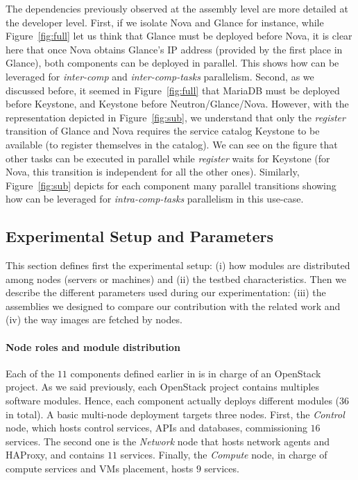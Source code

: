The dependencies previously observed at the assembly level are more
detailed at the developer level. First, if we isolate Nova and Glance
for instance, while Figure~\ref{fig:full} let us think that Glance
must be deployed before Nova, it is clear here that once Nova obtains
Glance's IP address (provided by the first place in Glance), both
components can be deployed in parallel. This shows how \mad can be
leveraged for \emph{inter-comp} and \emph{inter-comp-tasks}
parallelism.  Second, as we discussed before, it seemed in
Figure~\ref{fig:full} that MariaDB must be deployed before Keystone,
and Keystone before Neutron/Glance/Nova. However, with the \mad
representation depicted in Figure~\ref{fig:sub}, we understand that
only the \emph{register} transition of Glance and Nova requires the
service catalog Keystone to be available (\ie to register themselves
in the catalog). We can see on the figure that other tasks can be
executed in parallel while \emph{register} waits for Keystone (\eg for
Nova, this transition is independent for all the other
ones). Similarly, Figure~\ref{fig:sub} depicts for each component many
parallel transitions showing how \mad can be leveraged for
\emph{intra-comp-tasks} parallelism in this use-case.

\subsection{Experimental Setup and Parameters}

This section defines first the experimental setup: (i) how modules are
distributed among nodes (\ie servers or machines) and (ii) the testbed
characteristics. Then we describe the different parameters used during
our experimentation: (iii) the assemblies we designed to compare our
contribution with the related work and (iv) the way \docker images are
fetched by nodes.

\paragraph{Node roles and module distribution}
Each of the $11$ components defined earlier in \kolla is in charge of
an OpenStack project. As we said previously, each OpenStack project
contains multiples software modules. Hence, each component actually
deploys different modules ($36$ in total). A basic multi-node \kolla
deployment targets three nodes. First, the \emph{Control} node, which
hosts control services, APIs and databases, commissioning $16$
services. The second one is the \emph{Network} node that hosts network
agents and HAProxy, and contains $11$ services. Finally, the
\emph{Compute} node, in charge of compute services and VMs placement,
hosts $9$ services.

